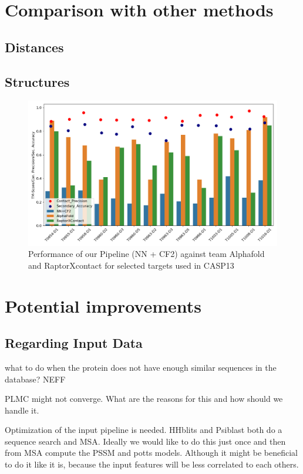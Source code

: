 \section{Comparison with other methods}
\subsection{Distances}
\subsection{Structures}

\begin{figure}
    \centering
    \includegraphics[width=\linewidth]{imgs_tomas/casp13_tm_contacts_sec.png}
    \caption{Performance of our Pipeline (NN + CF2) against team Alphafold and RaptorXcontact for selected targets used in CASP13}
    \label{fig:casp_performance}
\end{figure}

\section{Potential improvements}

\subsection{Regarding Input Data}
what to do when the protein does not have enough similar sequences in the database?
NEFF

PLMC might not converge. What are the reasons for this and how should we handle it.

Optimization of the input pipeline is needed.
HHblits and Psiblast both do a sequence search and MSA.
Ideally we would like to do this just once and then from MSA compute the PSSM and potts models.
Although it might be beneficial to do it like it is, because the input features will be less correlated to each others.

